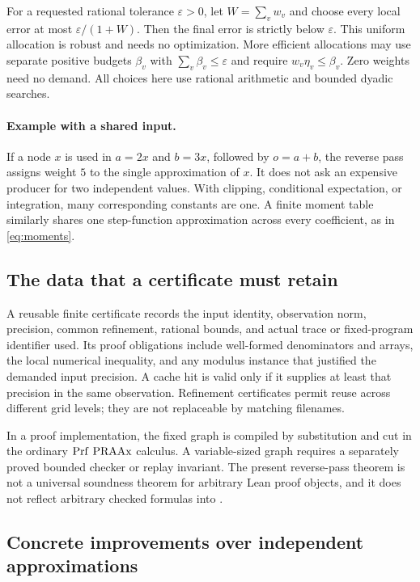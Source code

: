For a requested rational tolerance \(\varepsilon>0\), let
\(W=\sum_v w_v\) and choose every local error at most
\(\varepsilon/(1+W)\). Then the final error is strictly below
\(\varepsilon\). This uniform allocation is robust and needs no
optimization. More efficient allocations may use separate positive
budgets \(\beta_v\) with \(\sum_v\beta_v\leq\varepsilon\) and
require \(w_v\eta_v\leq\beta_v\). Zero weights need no demand.
All choices here use rational arithmetic and bounded dyadic searches.

\paragraph{Example with a shared input.}
If a node \(x\) is used in \(a=2x\) and \(b=3x\), followed by
\(o=a+b\), the reverse pass assigns weight \(5\) to the single
approximation of \(x\). It does not ask an expensive producer for two
independent values. With clipping, conditional expectation, or
integration, many corresponding constants are one. A finite moment
table similarly shares one step-function approximation across every
coefficient, as in \eqref{eq:moments}.

\subsection{The data that a certificate must retain}

A reusable finite certificate records the input identity, observation
norm, precision, common refinement, rational bounds, and actual trace
or fixed-program identifier used. Its proof obligations include
well-formed denominators and arrays, the local numerical inequality,
and any modulus instance that justified the demanded input precision.
A cache hit is valid only if it supplies at least that precision in the
same observation. Refinement certificates permit reuse across
different grid levels; they are not replaceable by matching filenames.

In a proof implementation, the fixed graph is compiled by substitution
and cut in the ordinary \(\operatorname{Prf}\,\mathrm{PRAAx}\) calculus. A
variable-sized graph requires a separately proved bounded checker or
replay invariant. The present reverse-pass theorem is not a universal
soundness theorem for arbitrary Lean proof objects, and it does not
reflect arbitrary checked formulas into \ipra.

\subsection{Concrete improvements over independent approximations}


